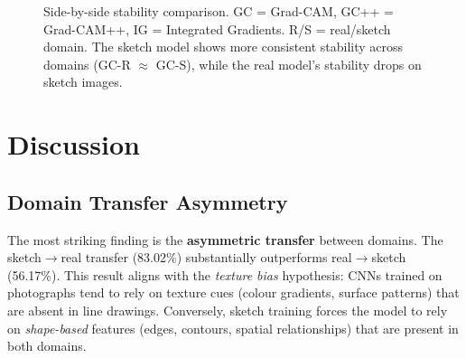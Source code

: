 \documentclass[12pt, a4paper]{article}
\begin{document}
\begin{figure}[H]
\centering
{}
\caption{Side-by-side stability comparison.  GC = Grad-CAM,
GC++ = Grad-CAM++, IG = Integrated Gradients.  R/S = real/sketch domain.
The sketch model shows more consistent stability across domains (GC-R
$\approx$ GC-S), while the real model's stability drops on sketch images.}
\label{fig:stability_comparison}
\end{figure}


\section{Discussion}
\label{sec:discussion}

\subsection{Domain Transfer Asymmetry}

The most striking finding is the \textbf{asymmetric transfer} between domains.
The sketch$\to$real transfer (83.02\%) substantially outperforms real$\to$sketch
(56.17\%).  This result aligns with the \emph{texture bias} hypothesis: CNNs
trained on photographs tend to rely on texture cues (colour gradients, surface
patterns) that are absent in line drawings.  Conversely, sketch training forces
the model to rely on \emph{shape-based} features (edges, contours, spatial
relationships) that are present in both domains.
\end{document}

